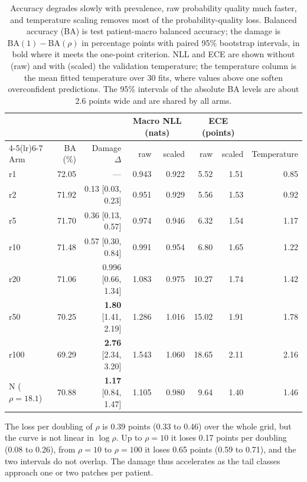 \begin{table}[htbp]
\centering
\small
\setlength{\tabcolsep}{4pt}
\renewcommand{\arraystretch}{1.15}
\begin{tabular}{@{}lrrrrrrr@{}}
\toprule
 & & & \multicolumn{2}{c}{Macro NLL (nats)} & \multicolumn{2}{c}{ECE (points)} & \\
\cmidrule(lr){4-5}\cmidrule(lr){6-7}
Arm & BA (\%) & Damage $\Delta$ & raw & scaled & raw & scaled & Temperature \\
\midrule
r1 & 72.05 & --- & 0.943 & 0.922 & 5.52 & 1.51 & 0.85 \\
r2 & 71.92 & 0.13 [0.03, 0.23] & 0.951 & 0.929 & 5.56 & 1.53 & 0.92 \\
r5 & 71.70 & 0.36 [0.13, 0.57] & 0.974 & 0.946 & 6.32 & 1.54 & 1.17 \\
r10 & 71.48 & 0.57 [0.30, 0.84] & 0.991 & 0.954 & 6.80 & 1.65 & 1.22 \\
r20 & 71.06 & 0.996 [0.66, 1.34] & 1.083 & 0.975 & 10.27 & 1.74 & 1.42 \\
r50 & 70.25 & \textbf{1.80} [1.41, 2.19] & 1.286 & 1.016 & 15.02 & 1.91 & 1.78 \\
r100 & 69.29 & \textbf{2.76} [2.34, 3.20] & 1.543 & 1.060 & 18.65 & 2.11 & 2.16 \\
\addlinespace
N ($\rho=18.1$) & 70.88 & \textbf{1.17} [0.84, 1.47] & 1.105 & 0.980 & 9.64 & 1.40 & 1.46 \\
\bottomrule
\end{tabular}
\caption{Accuracy degrades slowly with prevalence, raw probability quality much faster, and temperature scaling removes most of the probability-quality loss. Balanced accuracy (BA) is test patient-macro balanced accuracy; the damage is $\mathrm{BA}(1)-\mathrm{BA}(\rho)$ in percentage points with paired 95\% bootstrap intervals, in bold where it meets the one-point criterion. NLL and ECE are shown without (raw) and with (scaled) the validation temperature; the temperature column is the mean fitted temperature over 30 fits, where values above one soften overconfident predictions. The 95\% intervals of the absolute BA levels are about 2.6 points wide and are shared by all arms.}
\label{tab:curve}
\end{table}

\noindent The loss per doubling of $\rho$ is 0.39 points (0.33 to 0.46) over the whole grid, but the curve is not linear in $\log\rho$. Up to $\rho=10$ it loses 0.17 points per doubling (0.08 to 0.26), from $\rho=10$ to $\rho=100$ it loses 0.65 points (0.59 to 0.71), and the two intervals do not overlap. The damage thus accelerates as the tail classes approach one or two patches per patient.

